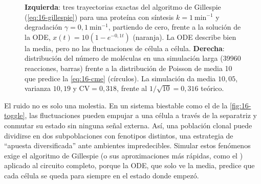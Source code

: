 \begin{figure}[t]
\centering
{}
\caption[Simulación estocástica frente a determinista]{\textbf{Izquierda}: tres trayectorias exactas del algoritmo de Gillespie (\cref{eq:16-gillespie}) para una proteína con síntesis $k=1\ \text{min}^{-1}$ y degradación $\gamma=0{,}1\ \text{min}^{-1}$, partiendo de cero, frente a la solución de la ODE, $x(t)=10(1-e^{-0{,}1t})$ (naranja). La ODE describe bien la media, pero no las fluctuaciones de célula a célula. \textbf{Derecha}: distribución del número de moléculas en una simulación larga (\num{39960} reacciones, barras) frente a la distribución de Poisson de media 10 que predice la \cref{eq:16-cme} (círculos). La simulación da media $10{,}05$, varianza $10{,}19$ y $\mathrm{CV}=0{,}318$, frente al $1/\sqrt{10}=0{,}316$ teórico.}
\label{fig:16-ssa}
\end{figure}

\begin{profundizacion}
El ruido no es solo una molestia. En un sistema biestable como el de la \cref{fig:16-toggle}, las fluctuaciones pueden empujar a una célula a través de la separatriz y conmutar su estado sin ninguna señal externa. Así, una población clonal puede dividirse en dos subpoblaciones con fenotipos distintos, una estrategia de ``apuesta diversificada'' ante ambientes impredecibles. Simular estos fenómenos exige el algoritmo de Gillespie (o sus aproximaciones más rápidas, como el ) aplicado al circuito completo, porque la ODE, que solo ve la media, predice que cada célula se queda para siempre en el estado donde empezó.
\end{profundizacion}

